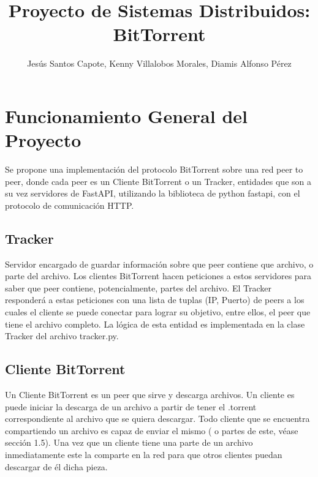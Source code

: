 \documentclass[article]{llncs}
\begin{document}
%
\title{Proyecto de Sistemas Distribuidos: BitTorrent}
%
%
\author{Jes\'us Santos Capote, Kenny Villalobos Morales, Diamis Alfonso P\'erez}
%
%
\maketitle              %
%

\section{Funcionamiento General del Proyecto}
Se propone una implementación del protocolo BitTorrent sobre una red peer to peer, donde cada peer es un 
Cliente BitTorrent o un Tracker, entidades que son a su vez servidores de FastAPI, utilizando la biblioteca de python fastapi, 
con el protocolo de comunicación HTTP.

\subsection{Tracker}
Servidor encargado de guardar información sobre que peer contiene que archivo, o parte del archivo. Los clientes 
BitTorrent hacen peticiones a estos servidores para saber que peer contiene, potencialmente, partes del archivo. El Tracker
responderá a estas peticiones con una lista de tuplas (IP, Puerto) de peers a los cuales el cliente se puede conectar para 
lograr su objetivo, entre ellos, el peer que tiene el archivo completo. La lógica de esta entidad es implementada en la clase 
Tracker del archivo tracker.py.

\subsection{Cliente BitTorrent}
Un Cliente BitTorrent es un peer que sirve y descarga archivos. Un cliente es puede iniciar la descarga de un archivo a partir de tener
el .torrent correspondiente al archivo que se quiera descargar. Todo cliente que se encuentra compartiendo un archivo es capaz de
enviar el mismo ( o partes de este, véase secci\'on 1.5). Una vez que un cliente tiene una parte de un archivo inmediatamente 
este la comparte en la red para que otros clientes puedan descargar de él dicha pieza.
\end{document}
